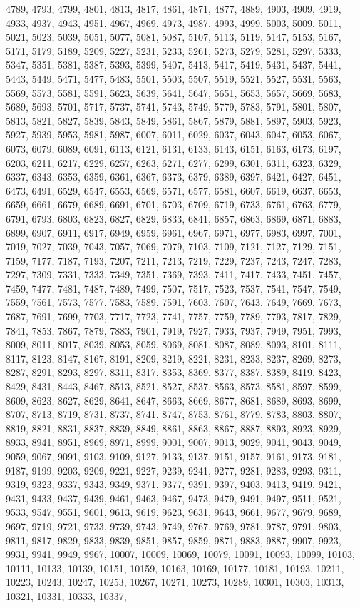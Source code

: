 \documentclass[10pt,twocolumn]{article}
\begin{document}
\begin{thebibliography}{9}
4789, 4793, 4799, 4801, 4813, 4817, 4861, 4871, 4877, 4889, 4903, 4909, 4919, 4933, 4937, 4943, 4951, 4967, 4969, 4973, 4987, 4993, 4999, 5003, 5009, 5011, 5021, 5023, 5039, 5051, 5077, 5081, 5087, 5107, 5113, 5119, 5147, 5153, 5167, 5171, 5179, 5189, 5209, 5227, 5231, 5233, 5261, 5273, 5279, 5281, 5297, 5333, 5347, 5351, 5381, 5387, 5393, 5399, 5407, 5413, 5417, 5419, 5431, 5437, 5441, 5443, 5449, 5471, 5477, 5483, 5501, 5503, 5507, 5519, 5521, 5527, 5531, 5563, 5569, 5573, 5581, 5591, 5623, 5639, 5641, 5647, 5651, 5653, 5657, 5669, 5683, 5689, 5693, 5701, 5717, 5737, 5741, 5743, 5749, 5779, 5783, 5791, 5801, 5807, 5813, 5821, 5827, 5839, 5843, 5849, 5861, 5867, 5879, 5881, 5897, 5903, 5923, 5927, 5939, 5953, 5981, 5987, 6007, 6011, 6029, 6037, 6043, 6047, 6053, 6067, 6073, 6079, 6089, 6091, 6113, 6121, 6131, 6133, 6143, 6151, 6163, 6173, 6197, 6203, 6211, 6217, 6229, 6257, 6263, 6271, 6277, 6299, 6301, 6311, 6323, 6329, 6337, 6343, 6353, 6359, 6361, 6367, 6373, 6379, 6389, 6397, 6421, 6427, 6451, 6473, 6491, 6529, 6547, 6553, 6569, 6571, 6577, 6581, 6607, 6619, 6637, 6653, 6659, 6661, 6679, 6689, 6691, 6701, 6703, 6709, 6719, 6733, 6761, 6763, 6779, 6791, 6793, 6803, 6823, 6827, 6829, 6833, 6841, 6857, 6863, 6869, 6871, 6883, 6899, 6907, 6911, 6917, 6949, 6959, 6961, 6967, 6971, 6977, 6983, 6997, 7001, 7019, 7027, 7039, 7043, 7057, 7069, 7079, 7103, 7109, 7121, 7127, 7129, 7151, 7159, 7177, 7187, 7193, 7207, 7211, 7213, 7219, 7229, 7237, 7243, 7247, 7283, 7297, 7309, 7331, 7333, 7349, 7351, 7369, 7393, 7411, 7417, 7433, 7451, 7457, 7459, 7477, 7481, 7487, 7489, 7499, 7507, 7517, 7523, 7537, 7541, 7547, 7549, 7559, 7561, 7573, 7577, 7583, 7589, 7591, 7603, 7607, 7643, 7649, 7669, 7673, 7687, 7691, 7699, 7703, 7717, 7723, 7741, 7757, 7759, 7789, 7793, 7817, 7829, 7841, 7853, 7867, 7879, 7883, 7901, 7919, 7927, 7933, 7937, 7949, 7951, 7993, 8009, 8011, 8017, 8039, 8053, 8059, 8069, 8081, 8087, 8089, 8093, 8101, 8111, 8117, 8123, 8147, 8167, 8191, 8209, 8219, 8221, 8231, 8233, 8237, 8269, 8273, 8287, 8291, 8293, 8297, 8311, 8317, 8353, 8369, 8377, 8387, 8389, 8419, 8423, 8429, 8431, 8443, 8467, 8513, 8521, 8527, 8537, 8563, 8573, 8581, 8597, 8599, 8609, 8623, 8627, 8629, 8641, 8647, 8663, 8669, 8677, 8681, 8689, 8693, 8699, 8707, 8713, 8719, 8731, 8737, 8741, 8747, 8753, 8761, 8779, 8783, 8803, 8807, 8819, 8821, 8831, 8837, 8839, 8849, 8861, 8863, 8867, 8887, 8893, 8923, 8929, 8933, 8941, 8951, 8969, 8971, 8999, 9001, 9007, 9013, 9029, 9041, 9043, 9049, 9059, 9067, 9091, 9103, 9109, 9127, 9133, 9137, 9151, 9157, 9161, 9173, 9181, 9187, 9199, 9203, 9209, 9221, 9227, 9239, 9241, 9277, 9281, 9283, 9293, 9311, 9319, 9323, 9337, 9343, 9349, 9371, 9377, 9391, 9397, 9403, 9413, 9419, 9421, 9431, 9433, 9437, 9439, 9461, 9463, 9467, 9473, 9479, 9491, 9497, 9511, 9521, 9533, 9547, 9551, 9601, 9613, 9619, 9623, 9631, 9643, 9661, 9677, 9679, 9689, 9697, 9719, 9721, 9733, 9739, 9743, 9749, 9767, 9769, 9781, 9787, 9791, 9803, 9811, 9817, 9829, 9833, 9839, 9851, 9857, 9859, 9871, 9883, 9887, 9907, 9923, 9931, 9941, 9949, 9967, 10007, 10009, 10069, 10079, 10091, 10093, 10099, 10103, 10111, 10133, 10139, 10151, 10159, 10163, 10169, 10177, 10181, 10193, 10211, 10223, 10243, 10247, 10253, 10267, 10271, 10273, 10289, 10301, 10303, 10313, 10321, 10331, 10333, 10337, 
\end{thebibliography}
\end{document}
